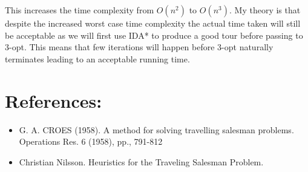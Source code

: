 \documentclass[11pt,a4paper]{article}
\begin{document}
This increases the time complexity from $O(n^2)$ to $O(n^3)$. My theory is that despite the increased worst case time complexity the actual time taken will still be acceptable as we will first use IDA* to produce a good tour before passing to 3-opt. This means that few iterations will happen before 3-opt naturally terminates leading to an acceptable running time. 

\vspace{5pt}
\noindent\hrulefill


\vspace{5pt}

\section*{References:}

\begin{itemize}
	\item G. A. CROES (1958). A method for solving travelling salesman problems. Operations Res. 6 (1958), pp., 791-812 
\item Christian Nilsson. Heuristics for the Traveling Salesman Problem.
\end{itemize}
\end{document}
